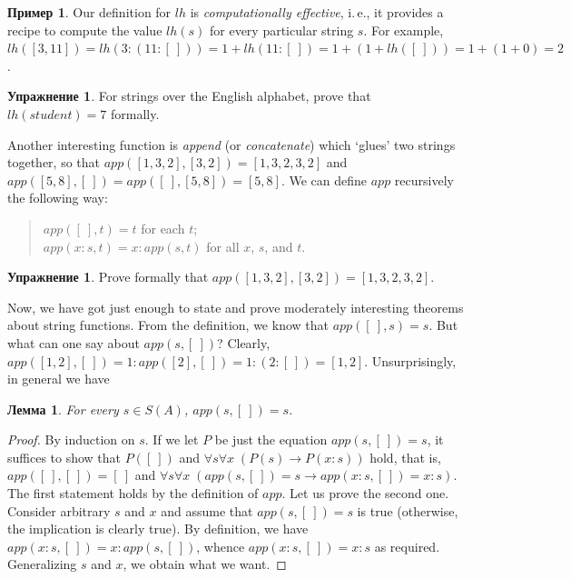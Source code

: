 \documentclass[12pt,notitlepage]{article}
\theoremstyle{plain}
\newtheorem{lemma}[thm]{Лемма}
\theoremstyle{definition}
\newtheorem{exc}[thm]{Упражнение}
\newtheorem{exm}[thm]{Пример}
\theoremstyle{plain}
\newcommand{\1}{\mathbf{1}}
\newcommand{\0}{\mathbf{0}}
\newcommand{\mcomm}[1]{}
\begin{document}
\mcomm{It is easy to prove the uniqueness by IP application but the existence would likely require some `set-theoretic' considerations, which we want to avoid here.}

\begin{exm}
	Our definition for $lh$ is \emph{computationally effective}, i.\,e., it provides a recipe to compute the value $lh(s)$ for every particular string $s$. For example, $lh([3,11]) = lh (3:(11:[\ ])) = 1 + lh (11:[\ ]) = 1 + (1 + lh([\ ])) = 1 + (1 + 0) = 2$.
\end{exm}

\begin{exc}
	For strings over the English alphabet, prove that $lh(student) = 7$ formally.
\end{exc}

Another interesting function is \emph{append} (or \emph{concatenate}) which `glues' two strings together, so that $app([1,3,2],[3,2]) = [1,3,2,3,2]$ and $app([5,8], [\ ]) = app([\ ], [5,8]) = [5, 8]$. We can define $app$ recursively the following way:
\begin{quote}
	$app([\ ], t) = t$ for each $t$;\\
	$app(x : s, t) = x : app(s, t)$ for all $x$, $s$, and $t$.
\end{quote}
\begin{exc}
	Prove formally that $app([1,3,2],[3,2]) = [1,3,2,3,2]$.
\end{exc}

Now, we have got just enough to state and prove moderately interesting theorems about string functions. From the definition, we know that $app([\ ], s) = s$. But what can one say about $app (s, [\ ])$? Clearly, $app ([1, 2], [\ ]) = 1 : app ([2],  [\ ]) = 1 : (2 : [\ ]) = [1, 2]$. Unsurprisingly, in general we have
\begin{lemma}\label{cs:app_nil_r}
	For every $s \in S(A)$, $app (s, [\ ]) = s$.
\end{lemma}
\begin{proof}
	By induction on $s$. If we let $P$ be just the equation $app (s, [\ ]) = s$, it suffices to show that $P([\ ])$ and $\forall s \forall x\; (P(s) \to P(x:s))$ hold, that is, $app ([\ ], [\ ]) = [\ ]$ and $\forall s \forall x\; (app (s, [\ ]) = s \to app (x : s, [\ ]) = x : s)$. The first statement holds by the definition of $app$. Let us prove the second one. Consider arbitrary $s$ and $x$ and assume that $app (s, [\ ]) = s$ is true (otherwise, the implication is clearly true). By definition, we have $app (x : s, [\ ]) = x : app(s, [\ ])$, whence $app (x : s, [\ ]) = x : s$ as required. Generalizing $s$ and $x$, we obtain what we want.
\end{proof}
\end{document}
